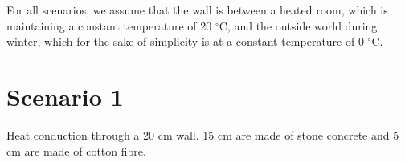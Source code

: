 For all scenarios, we assume that the wall is between a heated room, which is maintaining a constant temperature of 20 $^{\circ}$C, and the outside world during winter, which for the sake of simplicity is at a constant temperature of 0 $^{\circ}$C.

\begin{table}[!h]\caption{\label{tab_heat2}Material properties needed for scenarios.}
\end{table}


\section*{Scenario 1}

Heat conduction through a 20 cm wall. 15 cm are made of stone concrete and 5 cm are made of cotton fibre.

